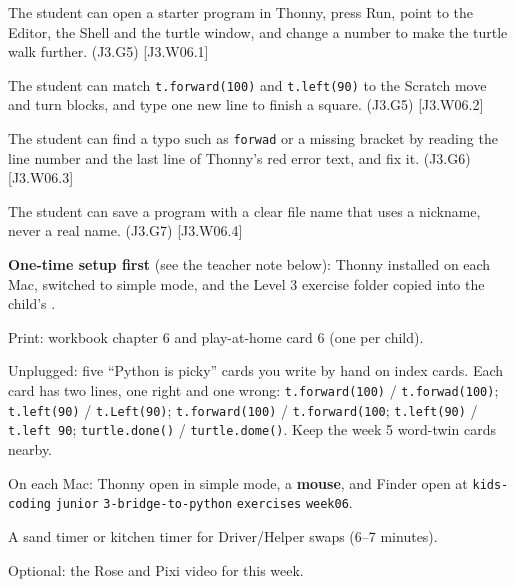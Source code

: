 
\begin{objectives}
  \item The student can open a starter program in Thonny, press Run, point to the Editor, the Shell and the turtle window, and change a number to make the turtle walk further. (J3.G5) [J3.W06.1]
  \item The student can match \texttt{t.forward(100)} and \texttt{t.left(90)} to the Scratch move and turn blocks, and type one new line to finish a square. (J3.G5) [J3.W06.2]
  \item The student can find a typo such as \texttt{forwad} or a missing bracket by reading the line number and the last line of Thonny's red error text, and fix it. (J3.G6) [J3.W06.3]
  \item The student can save a program with a clear file name that uses a nickname, never a real name. (J3.G7) [J3.W06.4]
\end{objectives}

\begin{materials}
  \item \textbf{One-time setup first} (see the teacher note below): Thonny installed on each Mac, switched to simple mode, and the Level 3 exercise folder copied into the child's .
  \item Print: workbook chapter 6 and play-at-home card 6 (one per child).
  \item Unplugged: five \enquote{Python is picky} cards you write by hand on index cards. Each card has two lines, one right and one wrong: \texttt{t.forward(100)} / \texttt{t.forwad(100)}; \texttt{t.left(90)} / \texttt{t.Left(90)}; \texttt{t.forward(100)} / \texttt{t.forward(100}; \texttt{t.left(90)} / \texttt{t.left 90}; \texttt{turtle.done()} / \texttt{turtle.dome()}. Keep the week 5 word-twin cards nearby.
  \item On each Mac: Thonny open in simple mode, a \textbf{mouse}, and Finder open at \texttt{kids-coding} \textrightarrow{} \texttt{junior} \textrightarrow{} \texttt{3-bridge-to-python} \textrightarrow{} \texttt{exercises} \textrightarrow{} \texttt{week06}.
  \item A sand timer or kitchen timer for Driver/Helper swaps (6--7 minutes).
  \item Optional: the Rose and Pixi video for this week.
\end{materials}

